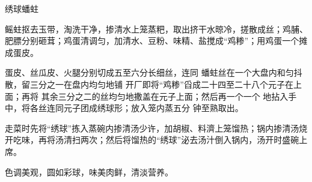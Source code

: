 \begin{recipe}{绣球蟠蛀}

\ingredients


\cooking

\step 鳐蛀抠去玉带，淘洗干净，掺清水上笼蒸粑，取出挤干水晾冷，搓散成丝；鸡脯、肥膘分别砸茸；鸡蛋清调匀，加清水、豆粉、味精、盐搅成“鸡糁”；用鸡蛋一个摊成蛋皮。

蛋皮、丝瓜皮、火腿分别切成五至六分长细丝，连同 蟠蛀丝在一个大盘内和匀抖散，留三分之一在盘内均匀地铺 开厂即将“鸡糁”舀成二十四至二十八个元子在上面；再将 其余三分之二的丝均匀地撒盖在元子上面；然后再一个一个 地拈入手中，将各丝连同元子团成绣球形；放入笼内蒸五分 钟至熟取出。

\step 走菜时先将“绣球”拣入蒸碗内掺清汤少许，加胡椒、料濟上笼馏热；锅内掺清汤烧开吃味，再将汤清扫两次；然后将馏热的“绣球”泌去汤汁倒入锅内，汤开时盛碗上席。

\notes

色调美观，圆如彩球，味美肉鲜，清淡营养。

\end{recipe}

